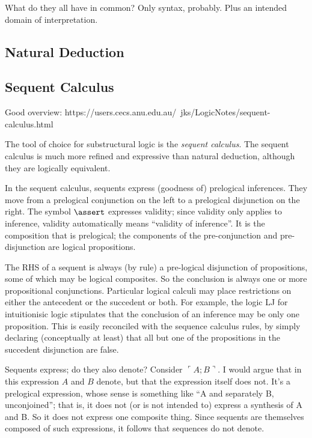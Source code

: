\documentclass{article}
\begin{document}
What do they all have in common? Only syntax, probably. Plus an
intended domain of interpretation.

\subsection{Natural Deduction}


\subsection{Sequent Calculus}

Good overview:
https://users.cecs.anu.edu.au/~jks/LogicNotes/sequent-calculus.html


The tool of choice for substructural logic is the \textit{sequent
  calculus}. The sequent calculus is much more refined and expressive
than natural deduction, although they are logically equivalent.

In the sequent calculus, sequents express (goodness of) prelogical
inferences. They move from a prelogical conjunction on the left to a
prelogical disjunction on the right. The symbol \(\linfer\) expresses
validity; since validity only applies to inference, validity
automatically means ``validity of inference''. It is the composition
that is prelogical; the components of the pre-conjunction and
pre-disjunction are logical propositions.

The RHS of a sequent is always (by rule) a pre-logical disjunction of
propositions, some of which may be logical composites. So the
conclusion is always one or more propositional conjunctions.
Particular logical calculi may place restrictions on either the
antecedent or the succedent or both. For example, the logic LJ for
intuitionisic logic stipulates that the conclusion of an inference may
be only one proposition. This is easily reconciled with the sequence
calculus rules, by simply declaring (conceptually at least) that all
but one of the propositions in the succedent disjunction are false.

Sequents express; do they also denote? Consider \(\ulcorner
A;B\urcorner\). I would argue that in this expression \(A\) and \(B\)
denote, but that the expression itself does not. It's a prelogical
expression, whose sense is something like ``A and separately B,
unconjoined''; that is, it does not (or is not intended to) express a
synthesis of A and B. So it does not express one composite thing.
Since sequents are themselves composed of such expressions, it follows
that sequences do not denote.
\end{document}
